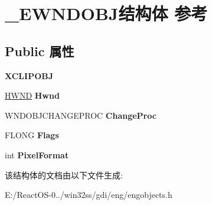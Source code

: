 \hypertarget{struct___e_w_n_d_o_b_j}{}\section{\+\_\+\+E\+W\+N\+D\+O\+B\+J结构体 参考}
\label{struct___e_w_n_d_o_b_j}
\subsection*{Public 属性}
\begin{DoxyCompactItemize}
\item 
\mbox{\label{struct___e_w_n_d_o_b_j_a45287e621bf21b0fc0d0e43ec95eedee}} 
{\bfseries X\+C\+L\+I\+P\+O\+BJ}
\item 
\mbox{\label{struct___e_w_n_d_o_b_j_a5f72e73dee97e7da6762f6f9376b4ee7}} 
\hyperlink{interfacevoid}{H\+W\+ND} {\bfseries Hwnd}
\item 
\mbox{\label{struct___e_w_n_d_o_b_j_a066d4df7264371b5015df14ff4fcc207}} 
W\+N\+D\+O\+B\+J\+C\+H\+A\+N\+G\+E\+P\+R\+OC {\bfseries Change\+Proc}
\item 
\mbox{\label{struct___e_w_n_d_o_b_j_a8390382c470dcb46c11969e05aed583d}} 
F\+L\+O\+NG {\bfseries Flags}
\item 
\mbox{\label{struct___e_w_n_d_o_b_j_a48219e6136a8f995bc2c2d60a6a6f83b}} 
int {\bfseries Pixel\+Format}
\end{DoxyCompactItemize}


该结构体的文档由以下文件生成\+:\begin{DoxyCompactItemize}
\item 
E\+:/\+React\+O\+S-\/0../win32ss/gdi/eng/engobjects.\+h\end{DoxyCompactItemize}
